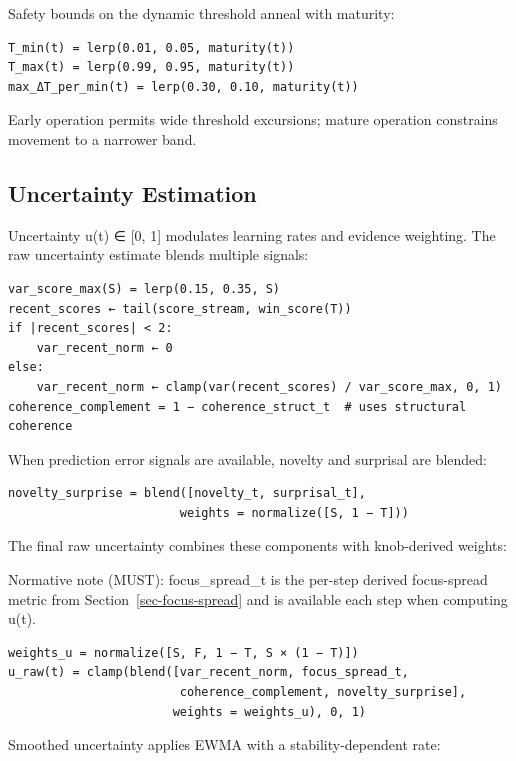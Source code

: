 \documentclass[
  letterpaper,
  DIV=11,
  numbers=noendperiod]{scrartcl}
\begin{document}
Safety bounds on the dynamic threshold anneal with maturity:

\begin{verbatim}
T_min(t) = lerp(0.01, 0.05, maturity(t))
T_max(t) = lerp(0.99, 0.95, maturity(t))
max_ΔT_per_min(t) = lerp(0.30, 0.10, maturity(t))
\end{verbatim}

Early operation permits wide threshold excursions; mature operation
constrains movement to a narrower band.

\subsection{Uncertainty Estimation}\label{uncertainty-estimation}

Uncertainty u(t) ∈ {[}0, 1{]} modulates learning rates and evidence
weighting. The raw uncertainty estimate blends multiple signals:

\begin{verbatim}
var_score_max(S) = lerp(0.15, 0.35, S)
recent_scores ← tail(score_stream, win_score(T))
if |recent_scores| < 2:
    var_recent_norm ← 0
else:
    var_recent_norm ← clamp(var(recent_scores) / var_score_max, 0, 1)
coherence_complement = 1 − coherence_struct_t  # uses structural coherence
\end{verbatim}

When prediction error signals are available, novelty and surprisal are
blended:

\begin{verbatim}
novelty_surprise = blend([novelty_t, surprisal_t],
                        weights = normalize([S, 1 − T]))
\end{verbatim}

The final raw uncertainty combines these components with knob-derived
weights:

Normative note (MUST): focus\_spread\_t is the per-step derived
focus-spread metric from Section~\ref{sec-focus-spread} and is available
each step when computing u(t).

\begin{verbatim}
weights_u = normalize([S, F, 1 − T, S × (1 − T)])
u_raw(t) = clamp(blend([var_recent_norm, focus_spread_t,
                        coherence_complement, novelty_surprise],
                       weights = weights_u), 0, 1)
\end{verbatim}

Smoothed uncertainty applies EWMA with a stability-dependent rate:
\end{document}
